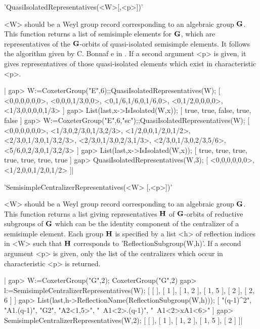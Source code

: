 
'QuasiIsolatedRepresentatives(<W>[,<p>])'

<W>  should  be  a  Weyl  group  record corresponding to an algebraic group
${\mathbf G}$. This function returns a list of semisimple elements for ${\mathbf G}$, which
are  representatives  of  the  ${\mathbf G}$-orbits  of  quasi-isolated  semisimple
elements.  It  follows  the  algorithm  given  by C. Bonnaf{ e} in
\cite{Bon05}.  If a second argument <p>  is given, it gives representatives
of those quasi-isolated elements which exist in characteristic <p>.

|    gap> W:=CoxeterGroup("E",6);;QuasiIsolatedRepresentatives(W);
    [ <0,0,0,0,0,0>, <0,0,0,1/3,0,0>, <0,1/6,1/6,0,1/6,0>,
      <0,1/2,0,0,0,0>, <1/3,0,0,0,0,1/3> ]
    gap> List(last,x->IsIsolated(W,x));
    [ true, true, false, true, false ]
    gap> W:=CoxeterGroup("E",6,"sc");;QuasiIsolatedRepresentatives(W);
    [ <0,0,0,0,0,0>, <1/3,0,2/3,0,1/3,2/3>, <1/2,0,0,1/2,0,1/2>,
      <2/3,0,1/3,0,1/3,2/3>, <2/3,0,1/3,0,2/3,1/3>, <2/3,0,1/3,0,2/3,5/6>,
      <5/6,0,2/3,0,1/3,2/3> ]
    gap> List(last,x->IsIsolated(W,x));
    [ true, true, true, true, true, true, true ]
    gap> QuasiIsolatedRepresentatives(W,3);
    [ <0,0,0,0,0,0>, <1/2,0,0,1/2,0,1/2> ]|


'SemisimpleCentralizerRepresentatives(<W> [,<p>])'

<W>  should  be  a  Weyl  group  record corresponding to an algebraic group
${\mathbf G}$.  This  function  returns  a  list  giving  representatives  ${\mathbf H}$ of
${\mathbf G}$-orbits  of reductive  subgroups of  ${\mathbf G}$ which  can be  the identity
component  of the centralizer of a  semisimple element. Each group ${\mathbf H}$ is
specified  by  a  list  <h>  of  reflection  indices in <W> such that ${\mathbf H}$
corresponds  to  'ReflectionSubgroup(W,h)'.  If  a  second  argument <p> is
given,  only the list of the centralizers which occur in characteristic <p>
is returned.

|    gap> W:=CoxeterGroup("G",2);
    CoxeterGroup("G",2)
    gap> l:=SemisimpleCentralizerRepresentatives(W);
    [ [  ], [ 1 ], [ 1, 2 ], [ 1, 5 ], [ 2 ], [ 2, 6 ] ]
    gap> List(last,h->ReflectionName(ReflectionSubgroup(W,h)));
    [ "(q-1)^2", "A1.(q-1)", "G2", "A2<1,5>", "~A1<2>.(q-1)",
      "~A1<2>xA1<6>" ]
    gap> SemisimpleCentralizerRepresentatives(W,2);
    [ [  ], [ 1 ], [ 1, 2 ], [ 1, 5 ], [ 2 ] ]|

